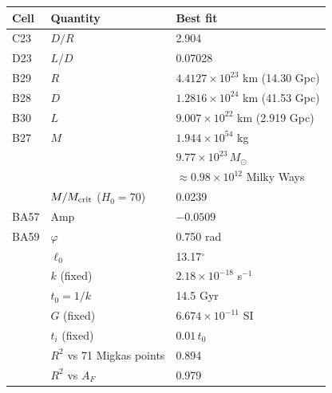\documentclass[10pt,letterpaper]{article}
\begin{document}
\begin{minipage}[t]{0.44\textwidth}\vspace{0pt}\centering\scriptsize\setlength{\tabcolsep}{3pt}
\begin{tabular}{lll}\toprule
Cell & Quantity & Best fit\\\midrule
C23 & $D/R$ & 2.904\\
D23 & $L/D$ & 0.07028\\
B29 & $R$ & $4.4127\times10^{23}$ km (14.30 Gpc)\\
B28 & $D$ & $1.2816\times10^{24}$ km (41.53 Gpc)\\
B30 & $L$ & $9.007\times10^{22}$ km (2.919 Gpc)\\
B27 & $M$ & $1.944\times10^{54}$ kg\\
    &     & $9.77\times10^{23}\,M_\odot$\\
    &     & $\approx 0.98\times10^{12}$ Milky Ways\\
    & $M/M_{\rm crit}$ ($H_0=70$) & 0.0239\\
BA57 & Amp & $-0.0509$\\
BA59 & $\varphi$ & 0.750 rad\\
 & $\ell_0$ & 13.17$^\circ$\\\midrule
 & $k$ (fixed) & $2.18\times10^{-18}$ s$^{-1}$\\
 & $t_0=1/k$ & 14.5 Gyr\\
 & $G$ (fixed) & $6.674\times10^{-11}$ SI\\
 & $t_i$ (fixed) & $0.01\,t_0$\\\midrule
 & $R^2$ vs 71 Migkas points & 0.894\\
 & $R^2$ vs $A_F$ & 0.979\\\bottomrule
\end{tabular}
\end{minipage}
\end{document}
